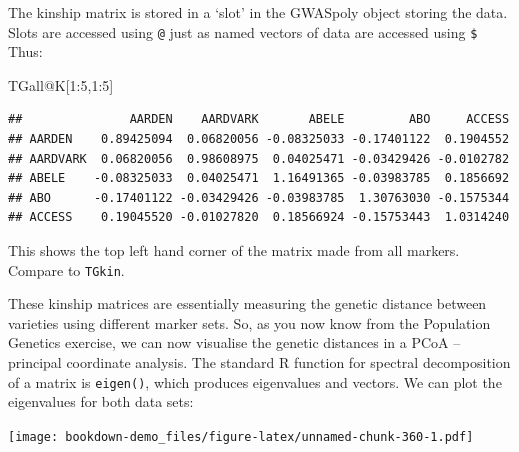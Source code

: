 \documentclass[
]{book}
\newenvironment{Shaded}{\begin{snugshade}}{\end{snugshade}}
\newcommand{\DecValTok}[1]{\textcolor[rgb]{0.00,0.00,0.81}{#1}}
\newcommand{\FunctionTok}[1]{\textcolor[rgb]{0.00,0.00,0.00}{#1}}
\newcommand{\NormalTok}[1]{#1}
\newcommand{\SpecialCharTok}[1]{\textcolor[rgb]{0.00,0.00,0.00}{#1}}
\begin{document}
The kinship matrix is stored in a `slot' in the GWASpoly object storing the data. Slots are accessed using \texttt{@} just as named vectors of data are accessed using \texttt{\$} Thus:

\begin{Shaded}
\begin{Highlighting}[]
\NormalTok{TGall}\SpecialCharTok{@}\NormalTok{K[}\DecValTok{1}\SpecialCharTok{:}\DecValTok{5}\NormalTok{,}\DecValTok{1}\SpecialCharTok{:}\DecValTok{5}\NormalTok{]}
\end{Highlighting}
\end{Shaded}

\begin{verbatim}
##               AARDEN    AARDVARK       ABELE         ABO     ACCESS
## AARDEN    0.89425094  0.06820056 -0.08325033 -0.17401122  0.1904552
## AARDVARK  0.06820056  0.98608975  0.04025471 -0.03429426 -0.0102782
## ABELE    -0.08325033  0.04025471  1.16491365 -0.03983785  0.1856692
## ABO      -0.17401122 -0.03429426 -0.03983785  1.30763030 -0.1575344
## ACCESS    0.19045520 -0.01027820  0.18566924 -0.15753443  1.0314240
\end{verbatim}

This shows the top left hand corner of the matrix made from all markers. Compare to \texttt{TGkin}.

These kinship matrices are essentially measuring the genetic distance between varieties using different marker sets. So, as you now know from the Population Genetics exercise, we can now visualise the genetic distances in a PCoA -- principal coordinate analysis. The standard R function for spectral decomposition of a matrix is \texttt{eigen()}, which produces eigenvalues and vectors. We can plot the eigenvalues for both data sets:

\begin{Shaded}
\end{Shaded}

\texttt{[image: bookdown-demo\_files/figure-latex/unnamed-chunk-360-1.pdf]}

\begin{Shaded}
\end{Shaded}
\end{document}
